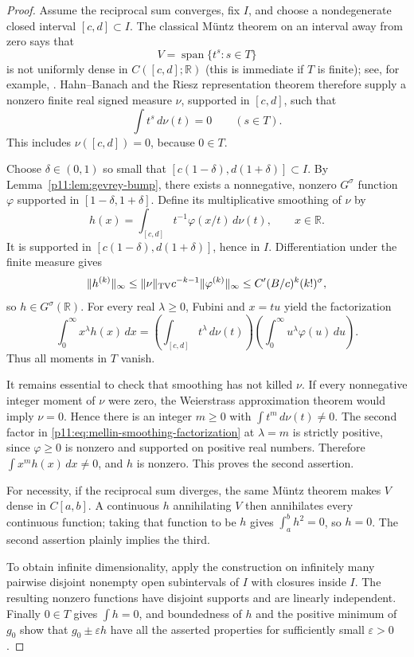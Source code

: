 \documentclass[11pt,letterpaper]{article}
\theoremstyle{definition}
\theoremstyle{remark}
\newcommand{\1}{\mathbf 1}
\begin{document}
\begin{proof}
Assume the reciprocal sum converges, fix $I$, and choose a nondegenerate
closed interval $[c,d]\subset I$. The classical M\"untz theorem on an
interval away from zero says that
\[
 V=\operatorname{span}\{t^s:s\in T\}
\]
is not uniformly dense in $C([c,d];\mathbb R)$ (this is immediate if $T$
is finite); see, for example,
\cite[Theorem~3.2]{BorweinErdelyi1995}. Hahn--Banach and the Riesz
representation theorem therefore supply a nonzero finite real signed
measure $\nu$, supported in $[c,d]$, such that
\[
 \int t^s\,d\nu(t)=0\qquad(s\in T).
\]
This includes $\nu([c,d])=0$, because $0\in T$.

Choose $\delta\in(0,1)$ so small that
$[c(1-\delta),d(1+\delta)]\subset I$. By
Lemma~\ref{p11:lem:gevrey-bump}, there exists a nonnegative, nonzero
$G^\sigma$ function $\varphi$ supported in
$[1-\delta,1+\delta]$. Define its multiplicative smoothing of $\nu$ by
\begin{equation}\label{p11:eq:multiplicative-smoothing}
 h(x)=\int_{[c,d]}t^{-1}\varphi(x/t)\,d\nu(t),\qquad x\in\mathbb R.
\end{equation}
It is supported in $[c(1-\delta),d(1+\delta)]$, hence in $I$.
Differentiation under the finite measure gives
\[
 \|h^{(k)}\|_\infty
 \leq \|\nu\|_{\rm TV}c^{-k-1}\|\varphi^{(k)}\|_\infty
 \leq C' (B/c)^k(k!)^\sigma,
\]
so $h\in G^\sigma(\mathbb R)$.
For every real $\lambda\geq0$, Fubini and $x=tu$ yield the factorization
\begin{equation}\label{p11:eq:mellin-smoothing-factorization}
 \int_0^\infty x^\lambda h(x)\,dx
 =\left(\int_{[c,d]}t^\lambda\,d\nu(t)\right)
  \left(\int_0^\infty u^\lambda\varphi(u)\,du\right).
\end{equation}
Thus all moments in $T$ vanish.

It remains essential to check that smoothing has not killed $\nu$.
If every nonnegative integer moment of $\nu$ were zero, the Weierstrass
approximation theorem would imply $\nu=0$. Hence there is an integer
$m\geq0$ with $\int t^m\,d\nu(t)\ne0$. The second factor in
\eqref{p11:eq:mellin-smoothing-factorization} at $\lambda=m$ is strictly
positive, since $\varphi\geq0$ is nonzero and supported on positive real
numbers. Therefore $\int x^m h(x)\,dx\ne0$, and $h$ is nonzero.
This proves the second assertion.

For necessity, if the reciprocal sum diverges, the same M\"untz theorem
makes $V$ dense in $C[a,b]$. A continuous $h$ annihilating $V$ then
annihilates every continuous function; taking that function to be $h$
gives $\int_a^b h^2=0$, so $h=0$. The second assertion plainly implies
the third.

To obtain infinite dimensionality, apply the construction on infinitely
many pairwise disjoint nonempty open subintervals of $I$ with closures
inside $I$. The resulting nonzero functions have disjoint supports and
are linearly independent. Finally $0\in T$ gives $\int h=0$, and
boundedness of $h$ and the positive minimum of $g_0$ show that
$g_0\pm\varepsilon h$ have all the asserted properties for sufficiently
small $\varepsilon>0$.
\end{proof}
\end{document}
